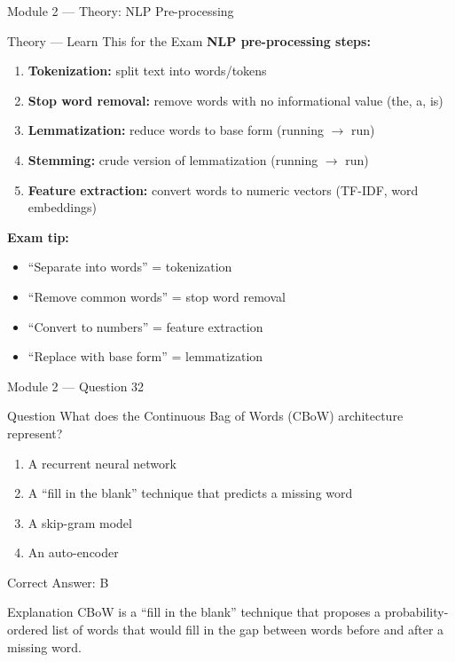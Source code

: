 \documentclass[aspectratio=169,10pt]{beamer}
\newcommand{\question}[1]{%
	\begin{block}{Question}
		#1
	\end{block}
}
\newcommand{\options}[4]{%
	\begin{enumerate}[label=\Alph*.,leftmargin=*]
		\item #1
		\item #2
		\item #3
		\item #4
	\end{enumerate}
}
\newcommand{\answerbox}[1]{%
	\begin{exampleblock}{Correct Answer: #1}
	\end{exampleblock}
}
\newcommand{\explain}[1]{%
	\begin{block}{Explanation}
		\small #1
	\end{block}
}
\newcommand{\theory}[1]{%
	\begin{block}{Theory --- Learn This for the Exam}
		\small #1
	\end{block}
}
\begin{document}
	\begin{frame}{Module 2 --- Theory: NLP Pre-processing}
		\theory{
			\textbf{NLP pre-processing steps:}
			\begin{enumerate}
				\item \textbf{Tokenization:} split text into words/tokens
				\item \textbf{Stop word removal:} remove words with no informational value (the, a, is)
				\item \textbf{Lemmatization:} reduce words to base form (running $\rightarrow$ run)
				\item \textbf{Stemming:} crude version of lemmatization (running $\rightarrow$ run)
				\item \textbf{Feature extraction:} convert words to numeric vectors (TF-IDF, word embeddings)
			\end{enumerate}
			\textbf{Exam tip:}
			\begin{itemize}
				\item ``Separate into words'' = tokenization
				\item ``Remove common words'' = stop word removal
				\item ``Convert to numbers'' = feature extraction
				\item ``Replace with base form'' = lemmatization
			\end{itemize}
		}
	\end{frame}
	
	\begin{frame}{Module 2 --- Question 32}
		\question{What does the Continuous Bag of Words (CBoW) architecture represent?}
		\options{A recurrent neural network}{A ``fill in the blank'' technique that predicts a missing word}{A skip-gram model}{An auto-encoder}
		\answerbox{B}
		\explain{CBoW is a ``fill in the blank'' technique that proposes a probability-ordered list of words that would fill in the gap between words before and after a missing word.}
	\end{frame}
	
\end{document}
